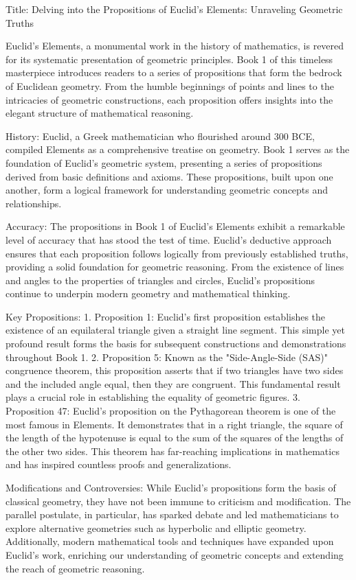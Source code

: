 Title: Delving into the Propositions of Euclid's Elements: Unraveling Geometric Truths

Euclid's Elements, a monumental work in the history of mathematics, is revered for its systematic presentation of geometric principles. Book 1 of this timeless masterpiece introduces readers to a series of propositions that form the bedrock of Euclidean geometry. From the humble beginnings of points and lines to the intricacies of geometric constructions, each proposition offers insights into the elegant structure of mathematical reasoning.

History:
Euclid, a Greek mathematician who flourished around 300 BCE, compiled Elements as a comprehensive treatise on geometry. Book 1 serves as the foundation of Euclid's geometric system, presenting a series of propositions derived from basic definitions and axioms. These propositions, built upon one another, form a logical framework for understanding geometric concepts and relationships.

Accuracy:
The propositions in Book 1 of Euclid's Elements exhibit a remarkable level of accuracy that has stood the test of time. Euclid's deductive approach ensures that each proposition follows logically from previously established truths, providing a solid foundation for geometric reasoning. From the existence of lines and angles to the properties of triangles and circles, Euclid's propositions continue to underpin modern geometry and mathematical thinking.

Key Propositions:
1. Proposition 1: Euclid's first proposition establishes the existence of an equilateral triangle given a straight line segment. This simple yet profound result forms the basis for subsequent constructions and demonstrations throughout Book 1.
2. Proposition 5: Known as the "Side-Angle-Side (SAS)" congruence theorem, this proposition asserts that if two triangles have two sides and the included angle equal, then they are congruent. This fundamental result plays a crucial role in establishing the equality of geometric figures.
3. Proposition 47: Euclid's proposition on the Pythagorean theorem is one of the most famous in Elements. It demonstrates that in a right triangle, the square of the length of the hypotenuse is equal to the sum of the squares of the lengths of the other two sides. This theorem has far-reaching implications in mathematics and has inspired countless proofs and generalizations.

Modifications and Controversies:
While Euclid's propositions form the basis of classical geometry, they have not been immune to criticism and modification. The parallel postulate, in particular, has sparked debate and led mathematicians to explore alternative geometries such as hyperbolic and elliptic geometry. Additionally, modern mathematical tools and techniques have expanded upon Euclid's work, enriching our understanding of geometric concepts and extending the reach of geometric reasoning.

